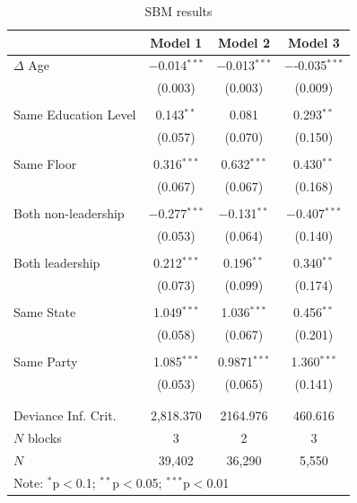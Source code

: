 \documentclass[fleqn,12pt]{wlscirep}
\begin{document}
\begin{table}
\begin{center}
\begin{tabular}{l c c c }
\hline
 & Model 1 & Model 2 & Model 3 \\
\hline
$\Delta$ Age & $-$0.014$^{***}$ & $-$0.013$^{***}$ & $-$-0.035$^{***}$ \\ 
  & (0.003) & (0.003) & (0.009) \\ 
  & & & \\ 
Same Education Level & 0.143$^{**}$ & 0.081 & 0.293$^{**}$ \\ 
  & (0.057) & (0.070) & (0.150) \\ 
  & & & \\ 
Same Floor & 0.316$^{***}$ & 0.632$^{***}$ & 0.430$^{**}$ \\ 
  & (0.067) & (0.067) & (0.168) \\ 
  & & & \\ 
Both non-leadership  & $-$0.277$^{***}$ & $-$0.131$^{**}$ & $-$0.407$^{***}$ \\ 
  & (0.053) & (0.064) & (0.140) \\ 
  & & & \\ 
Both leadership & 0.212$^{***}$ & 0.196$^{**}$ & 0.340$^{**}$ \\ 
  & (0.073) & (0.099) & (0.174) \\ 
  & & & \\ 
Same State & 1.049$^{***}$ & 1.036$^{***}$ & 0.456$^{**}$ \\ 
  & (0.058) & (0.067) & (0.201) \\ 
  & & & \\ 
Same Party & 1.085$^{***}$ & 0.9871$^{***}$ &1.360$^{***}$ \\ 
  & (0.053) & (0.065) & (0.141) \\ 
  & & & \\ 
\hline \\[-1.8ex] 
Deviance Inf. Crit. & 2,818.370 & 2164.976 & 460.616 \\ 
$N$ blocks & 3 & 2 & 3 \\ 
$N$ & 39,402 & 36,290 & 5,550 \\  
\hline
\multicolumn{4}{l}{\scriptsize{Note: {$^{*}$p$<$0.1; $^{**}$p$<$0.05; $^{***}$p$<$0.01}}}
\end{tabular}
\caption{SBM results}
\label{table:SBM_coefficients}
\end{center}
\end{table}
\end{document}
